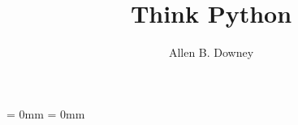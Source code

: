 \newcommand{\thetitle}{Think Python}
\newcommand{\thesubtitle}{How to Think Like a Computer Scientist}
\newcommand{\theauthors}{Allen B. Downey}
\newcommand{\theversion}{3.0.0}

\title{\thetitle}
\author{\theauthors}

\usepackage[T1]{fontenc}
\usepackage[utf8]{inputenc}
\usepackage{textcomp} %
\usepackage{amssymb,amsmath}
\usepackage[table]{xcolor}

\usepackage{roboto}

\usepackage{setspace}
\usepackage{graphicx}


\makeatletter
{}
\makeatother


\usepackage{bookmark}


\makeatletter
\def\fps@figure{h!}
\makeatother


\usepackage{makeidx}
\usepackage{upquote}
\usepackage[listings]{tcolorbox}
\newcommand{\passthrough}[1]{#1}


\usepackage{booktabs}
\usepackage{longtable}
\usepackage{calc}             %


\renewcommand{\toprule}{}
\renewcommand{\bottomrule}{}

\newcommand{\midsepremove}{\aboverulesep = 0mm
                           \belowrulesep = 0mm}
\midsepremove

\newcommand{\midsepdefault}{\aboverulesep = 0.605mm
                            \belowrulesep = 0.984mm}

\let\oldtabular\tabular
\renewcommand{\tabular}{\footnotesize\sffamily\oldtabular}

